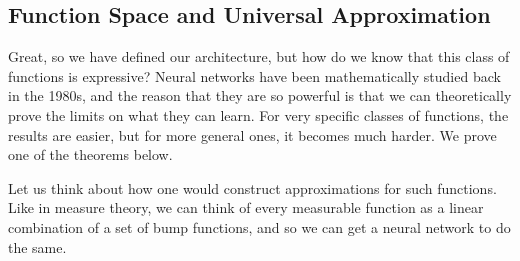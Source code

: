 \subsection{Function Space and Universal Approximation} 

  Great, so we have defined our architecture, but how do we know that this class of functions is expressive? Neural networks have been mathematically studied back in the 1980s, and the reason that they are so powerful is that we can theoretically prove the limits on what they can learn. For very specific classes of functions, the results are easier, but for more general ones, it becomes much harder. We prove one of the theorems below. 

  Let us think about how one would construct approximations for such functions. Like in measure theory, we can think of every measurable function as a linear combination of a set of bump functions, and so we can get a neural network to do the same.

